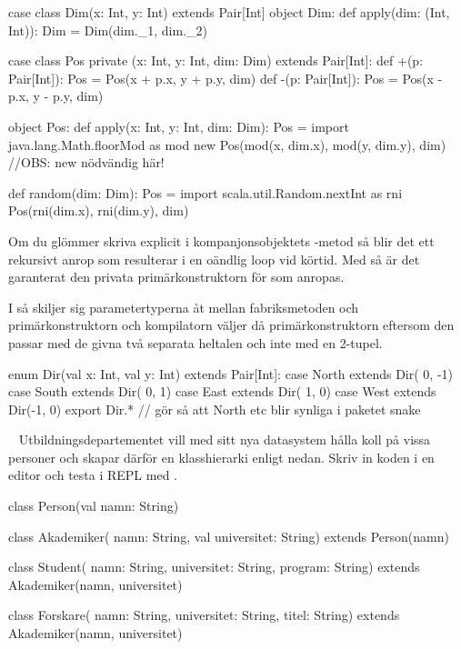 \SubtaskSolved
\begin{CodeSmall}
case class Dim(x: Int, y: Int) extends Pair[Int]
object Dim:
  def apply(dim: (Int, Int)): Dim = Dim(dim._1, dim._2)  
\end{CodeSmall}

\SubtaskSolved
\begin{CodeSmall}
case class Pos private (x: Int, y: Int, dim: Dim) extends Pair[Int]:
  def +(p: Pair[Int]): Pos = Pos(x + p.x, y + p.y, dim)
  def -(p: Pair[Int]): Pos = Pos(x - p.x, y - p.y, dim)

object Pos:
  def apply(x: Int, y: Int, dim: Dim): Pos = 
    import java.lang.Math.floorMod as mod
    new Pos(mod(x, dim.x), mod(y, dim.y), dim) //OBS: new nödvändig här!

  def random(dim: Dim): Pos = 
    import scala.util.Random.nextInt as rni
    Pos(rni(dim.x), rni(dim.y), dim)
\end{CodeSmall}

\SubtaskSolved Om du glömmer skriva  explicit i kompanjonsobjektets -metod så blir det ett rekursivt anrop som resulterar i en oändlig loop vid körtid. Med  så är det garanterat den privata primärkonstruktorn för  som anropas. 

I  så skiljer sig parametertyperna åt mellan fabriksmetoden och primärkonstruktorn och kompilatorn väljer då primärkonstruktorn eftersom den passar med de givna två separata heltalen och inte med en 2-tupel.

\SubtaskSolved
\begin{CodeSmall}
enum Dir(val x: Int, val y: Int) extends Pair[Int]:
  case North extends Dir( 0, -1)
  case South extends Dir( 0,  1)
  case East  extends Dir( 1,  0)
  case West  extends Dir(-1,  0)
export Dir.*  // gör så att North etc blir synliga i paketet snake
\end{CodeSmall}

\QUESTEND







\QUESTBEGIN

\Task  \what~  Utbildningsdepartementet vill med sitt nya datasystem hålla koll på vissa personer och skapar därför en klasshierarki enligt nedan. Skriv in koden i en editor och testa i REPL med .
\begin{Code}
class Person(val namn: String)

class Akademiker(
  namn: String,
  val universitet: String) extends Person(namn)

class Student(
  namn: String,
  universitet: String,
  program: String) extends Akademiker(namn, universitet)

class Forskare(
  namn: String,
  universitet: String,
  titel: String) extends Akademiker(namn, universitet)
\end{Code}


